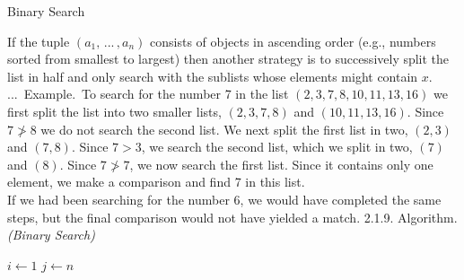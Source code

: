 \documentclass[smaller,hyperref={CJKbookmarks=true}]{beamer}
\newcounter{zhuo}[subsection]
\renewcommand{\thezhuo}{\thesection.\thesubsection.\arabic{zhuo}}
\newenvironment{EXAMPLE}{\stepcounter{zhuo}\alert{\!\thezhuo.~Example.\,}}{}
\begin{document}
\begin{frame}{Binary Search}
\begin{spacing}{1.1}
If the tuple $(a_1,\,...\,,a_n)$ consists of objects in ascending order (e.g.,
numbers sorted from smallest to largest) then another strategy is to
successively split the list in half and only search with the sublists whose
elements might contain $x$.\\[5pt]
\begin{EXAMPLE}
To search for the number 7 in the list $(2,3,7,8,10,11,13,16)$ we first split the list into two smaller lists, $(2,3,7,8)$ and $(10,11,13,16)$. Since $7\ngtr8$ we do not search the second list. We next split the first list in two, $(2,3)$ and $(7,8)$. Since $7>3$, we search the second list, which we split in two, $(7)$ and $(8)$. Since $7\ngtr7$, we now search the first list. Since it contains only one element, we make a
comparison and find 7 in this list.\\[5pt]
If we had been searching for the number 6, we would have completed the
same steps, but the final comparison would not have yielded a match.
\end{EXAMPLE}
\newpage
{}
\alert{2.1.9. Algorithm.} \emph{(Binary Search)}\\[3pt]
\IncMargin{1em}
\begin{algorithm}[H]
$i\leftarrow1$\;
$j\leftarrow n$\;
\end{algorithm}\DecMargin{1em}
\end{spacing}
\end{frame}
\end{document}
